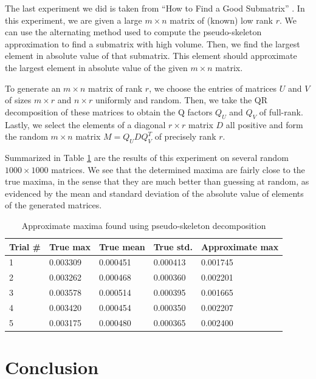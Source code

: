 \documentclass{article}
\begin{document}
	
	The last experiment we did is taken from ``How to Find a Good Submatrix'' \cite{goreinov_2010}. In this experiment, we are given a large $m\times n$ matrix of (known) low rank $r$. We can use the alternating \maxvol{} method used to compute the pseudo-skeleton approximation to find a submatrix with high volume. Then, we find the largest element in absolute value of that submatrix. This element should approximate the largest element in absolute value of the given $m\times n$ matrix.
	
	To generate an $m \times n$ matrix of rank $r$, we choose the entries of matrices $U$ and $V$ of sizes $m\times r$ and $n\times r$ uniformly and random. Then, we take the QR decomposition of these matrices to obtain the Q factors $Q_U$ and $Q_V$ of full-rank. Lastly, we select the elements of a diagonal $r\times r$ matrix $D$ all positive and form the random $m\times n$ matrix $M = Q_UDQ_V^T$ of precisely rank $r$.
	
	Summarized in Table \ref{table:approximate_maxima} are the results of this experiment on several random $1000\times1000$ matrices. We see that the determined maxima are fairly close to the true maxima, in the sense that they are much better than guessing at random, as evidenced by the mean and standard deviation of the absolute value of elements of the generated matrices.
	\begin{table}
		\centering
		\begin{tabular}{@{}lllll@{}}
			\toprule
			Trial \# & True max & True mean & True std. & Approximate max\\
			\midrule
			1 & 0.003309 & 0.000451 & 0.000413 & 0.001745\\
			2 & 0.003262 & 0.000468 & 0.000360 & 0.002201\\
			3 & 0.003578 & 0.000514 & 0.000395 & 0.001665\\
			4 & 0.003420 & 0.000454 & 0.000350 & 0.002207\\
			5 & 0.003175 & 0.000480 & 0.000365 & 0.002400\\
			\bottomrule
		\end{tabular}
		\caption{Approximate maxima found using pseudo-skeleton decomposition}
		\label{table:approximate_maxima}
	\end{table}
	
	\section{Conclusion}
	
\end{document}
